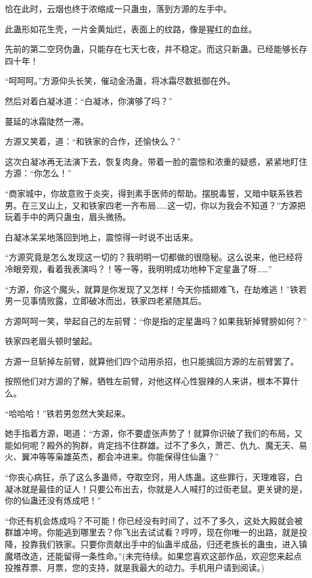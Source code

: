 \begin{this_body}
恰在此时，云烟也终于浓缩成一只蛊虫，落到方源的左手中。

此蛊形如花生壳，一片金黄灿烂，表面上的纹路，像是猩红的血丝。

先前的第二空窍伪蛊，只能存在七天七夜，并不稳定。而这只新蛊。已经能够长存四十年！

“呵呵呵。”方源仰头长笑，催动金汤蛊，将冰霜尽数抵御在外。

然后对着白凝冰道：“白凝冰，你演够了吗？”

蔓延的冰霜陡然一滞。

方源又笑着，道：“和铁家的合作，还愉快么？”

这次白凝冰再无法演下去，恢复肉身。带着一脸的震惊和浓重的疑惑，紧紧地盯住方源：“你怎么！”

“商家城中，你故意败于炎突，得到素手医师的帮助。摆脱毒誓，又暗中联系铁若男。在三叉山上，又和铁家四老一齐布局……这一切，你以为我会不知道？”方源把玩着手中的两只蛊虫，眉头微扬。

白凝冰呆呆地落回到地上，震惊得一时说不出话来。

“方源究竟是怎么发现这一切的？我明明一切都做的很隐秘。这么说来，他已经将冷眼旁观，看着我表演吗？！等一等，我明明成功地种下定星蛊了呀……”

“方源，你这个魔头，就算是你发现了又怎样！今天你插翅难飞，在劫难逃！”铁若男一见事情败露，立即破冰而出，铁家四老紧随其后。

方源呵呵一笑，举起自己的左前臂：“你是指的定星蛊吗？如果我斩掉臂膀如何？”

铁家四老眉头顿时皱起。

方源一旦斩掉左前臂，就算他们四个动用杀招，也只能擒回方源的左前臂罢了。

按照他们对方源的了解，牺牲左前臂，对他这样心性狠辣的人来讲，根本不算什么。

“哈哈哈！”铁若男忽然大笑起来。

她手指着方源，喝道：“方源，你不要虚张声势了！就算你识破了我们的布局，又能如何呢？殿外的狗群，肯定挡不住群雄。过不了多久，萧芒、仇九、魔无天、易火、翼冲等等枭雄英杰，都会冲进来。你能保得住仙蛊？”

“你丧心病狂，杀了这么多蛊师，夺取空窍，用人炼蛊。这些罪行，天理难容，白凝冰就是最佳的证人！只要公布出去，你就是人人喊打的过街老鼠。更关键的是，你的仙蛊还没有炼成吧！”

“你还有机会炼成吗？不可能！你已经没有时间了，过不了多久，这处大殿就会被群雄冲垮。你能逃到哪里去？你飞出去试试看？哼哼，现在你唯一的出路，就是投降，投靠我们铁家。只要你贡献出手中的仙蛊半成品，归还老族长的蛊虫，进入镇魔塔改造，还能留得一条性命。”(未完待续。如果您喜欢这部作品，欢迎您来起点投推荐票、月票，您的支持，就是我最大的动力。手机用户请到阅读。)

\end{this_body}

